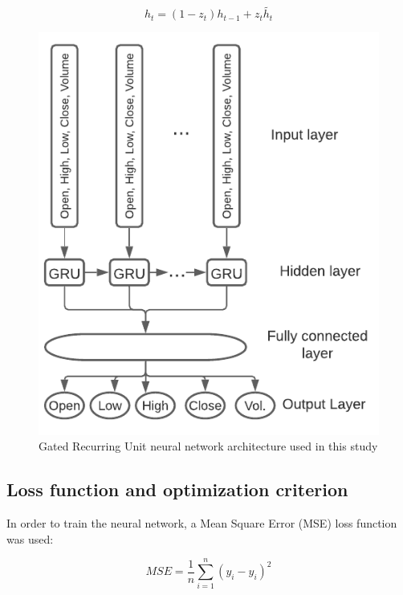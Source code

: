 \documentclass[10pt,twocolumn,letterpaper]{article}
\begin{document}
\begin{equation}
	h_t = (1-z_t) h_{t-1} + z_t \tilde{h_t}
\end{equation}

\begin{figure}[h]
	\begin{center}
		\includegraphics[width=1.0\linewidth]{GRU_nn.pdf}
	\end{center}
	\caption{Gated Recurring Unit neural network architecture used in this study}
	\label{fig:gru_nn}
\end{figure}

\subsection{Loss function and optimization criterion}

In order to train the neural network, a Mean Square Error (MSE) loss function was used:

\begin{equation}
	MSE = \frac{1}{n}\sum_{i=1}^{n} (y_i - \hat{y}_i)^2
\end{equation}
\end{document}
